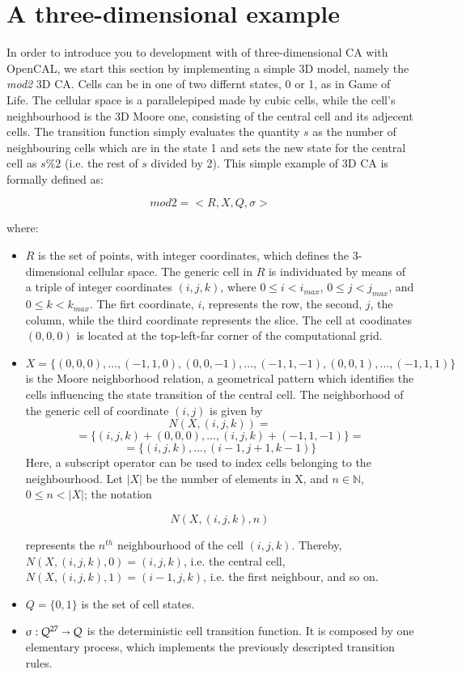 \section{A three-dimensional example}\label{sec:mod2}

In order to introduce you to development with of three-dimensional CA
with OpenCAL, we start this section by implementing a simple 3D model,
namely the \emph{mod2} 3D CA. Cells can be in one of two differnt
states, 0 or 1, as in Game of Life. The cellular space is a
parallelepiped made by cubic cells, while the cell's neighbourhood is
the 3D Moore one, consisting of the central cell and its adjecent
cells. The transition function simply evaluates the quantity $s$ as
the number of neighbouring cells which are in the state 1 and sets the
new state for the central cell as $s\%2$ (i.e. the rest of $s$ divided
by 2). This simple example of 3D CA is formally defined as:

$$mod2 = < R, X, Q, \sigma >$$

where:

\begin{itemize}

\item $R$ is the set of points, with integer coordinates, which
  defines the 3-dimensional cellular space. The generic cell in $R$ is
  individuated by means of a triple of integer coordinates $(i, j,
  k)$, where $0 \leq i < i_{max}$, $0 \leq j < j_{max}$, and $0 \leq k
  < k_{max}$. The firt coordinate, $i$, represents the row, the
  second, $j$, the column, while the third coordinate represents the
  slice. The cell at coodinates $(0,0,0)$ is located at the
  top-left-far corner of the computational grid.

\item $X = \{(0,0,0), \dots, (-1,1,0), (0,0,-1), \dots, (-1,1,-1),
  (0,0,1), \dots, (-1,1,1)\}$ is the Moore neighborhood
  relation, a geometrical pattern which identifies the cells
  influencing the state transition of the central cell. The
  neighborhood of the generic cell of coordinate $(i, j)$ is given by
  $$N(X, (i, j, k)) = $$
  $$= \{(i, j, k)+(0,0,0), \dots, (i, j, k)+(-1,1,-1)\} =$$
  $$= \{(i, j, k), \dots, (i-1,j+1,k-1)\}$$
  Here, a subscript operator can be used to index cells belonging to the
  neighbourhood. Let $|X|$ be the number of elements in X, and $n \in
  \mathbb{N}$, $0 \leq n < |X|$; the notation

  $$N(X, (i, j, k), n)$$

  represents the $n^{th}$ neighbourhood of the cell $(i,j,k)$. Thereby,
  $N(X, (i, j, k), 0) = (i, j, k)$, i.e. the central cell, $N(X, (i, j, k), 1)
  = (i-1, j, k)$, i.e. the first neighbour, and so on.
  
\item $Q = \{0, 1\}$ is the set of cell states.
  
\item $\sigma : Q^{27} \shortrightarrow Q$ is the deterministic cell
  transition function. It is composed by one elementary process, which
  implements the previously descripted transition rules.
\end{itemize}


